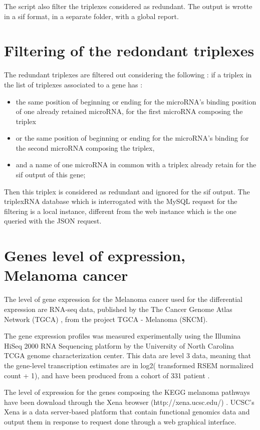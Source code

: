 \documentclass[a4paper,12pt]{report}
\begin{document}


The script also filter the triplexes considered as redundant. The output is wrotte in a sif format, in a separate folder, with a global report.

\section{Filtering of the redondant triplexes}

The redundant triplexes are filtered out considering the following : if a triplex in the list of triplexes associated to a gene has : 
\begin{itemize}
	\item the same position of beginning or ending for the microRNA's binding position of one already retained microRNA, for the first microRNA composing the triplex
	\item or the same position of beginning or ending for the microRNA's binding for the second microRNA composing the triplex, 
	\item and a name of one microRNA in common with a triplex already retain for the sif output of this gene;
\end{itemize}

Then this triplex is considered as redundant and ignored for the sif output.
The triplexRNA database which is interrogated with the MySQL request for the filtering is a local instance, different from the web instance which is the one queried with the JSON request. 

\section{Genes level of expression, Melanoma cancer}

The level of gene expression for the Melanoma cancer used for the differential expression are RNA-seq data, published by the The Cancer Genome Atlas Network (TGCA) \cite{TGCA}, from the project TGCA - Melanoma (SKCM).

The gene expression profiles was measured experimentally using the Illumina HiSeq 2000 RNA Sequencing platform by the University of North Carolina TCGA genome characterization center. This data are level 3 data, meaning that the gene-level transcription estimates are in log2( transformed RSEM normalized count + 1), and have been produced from a cohort of 331 patient \cite{TGCA}.

The level of expression for the genes composing the KEGG melanoma pathways have been download through the Xena browser (http://xena.ucsc.edu/) \cite{Xena}. UCSC's Xena is a data server-based platform that contain functional genomics data and output them in response to request done through a web graphical interface. 
\end{document}
